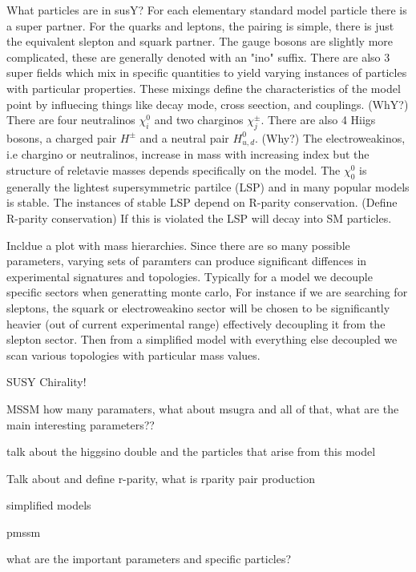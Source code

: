 What particles are in susY?
For each elementary standard model particle there is a super partner. For the quarks and leptons, the pairing is simple, there is just the equivalent slepton and squark partner. The gauge bosons are slightly more complicated, these are generally denoted with an "ino" suffix. There are also 3 super fields which mix in specific quantities to yield varying instances of particles with particular properties. These mixings define the characteristics of the model point by influecing things like decay mode, cross seection, and couplings.  (WhY?) There are four neutralinos $\chi^0_i$ and two charginos $\chi^\pm_j$. There are also 4 Hiigs bosons, a charged pair $H^\pm$ and a neutral pair $H^0_{u,d}$. (Why?)  The electroweakinos, i.e chargino or neutralinos, increase in mass with increasing index but the structure of reletavie masses depends specifically on the model. The $\chi^0_0$ is generally the lightest supersymmetric partilce (LSP) and in many popular models is stable. The instances of stable LSP depend on R-parity conservation. (Define R-parity conservation) If this is violated the LSP will decay into SM particles.



Incldue a plot with mass hierarchies. Since there are so many possible parameters, varying sets of paramters can produce significant diffences in experimental signatures and topologies. Typically for a model we decouple specific sectors when generatting monte carlo, For instance if we are searching for sleptons, the squark or electroweakino sector will be chosen to be significantly heavier (out of current experimental range) effectively decoupling it from the slepton sector. Then from a simplified model with everything else decoupled we scan various topologies with particular mass values. 


SUSY Chirality!

MSSM how many paramaters, what about msugra and all of that, what are the main interesting parameters??


talk about the higgsino double and the particles that arise from this model

Talk about and define r-parity, what is rparity pair production


simplified models

pmssm

what are the important parameters and specific particles?

